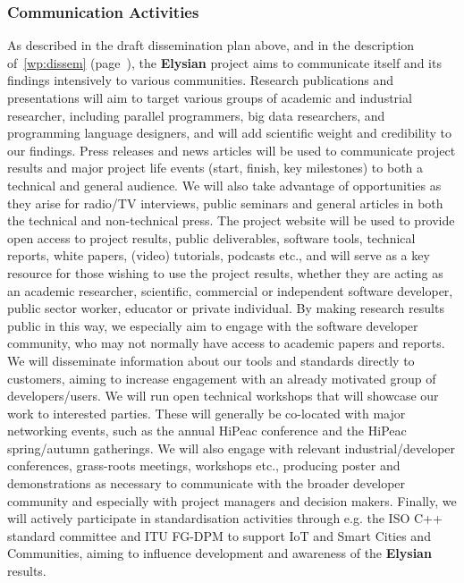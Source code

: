 \documentclass[a4paper,11pt]{article}
\newcommand{\project}[1]{\textbf{#1}\xspace}
\newcommand{\SECURITY}{\project{Elysian}}
\newcommand{\TheProject}{\SECURITY}
\begin{document}
\draftpage
\subsubsection{Communication Activities}
\label{sect:comm-activities}


As described in the draft dissemination plan above, and in the description of~\ref{wp:dissem} (page~\pageref{wp:dissem}),
the \TheProject{} project aims to communicate itself and its findings intensively to various communities.
Research publications and presentations will aim to target various groups of academic and industrial researcher,
including parallel programmers, big data researchers, and programming language
designers, and will add scientific weight and credibility to our findings.  Press releases and news articles will be used to communicate project results and major
project life events (start, finish, key milestones) to both a technical and general audience.
We will also take advantage of opportunities as they arise for radio/TV interviews, public seminars and general articles
in both the technical and non-technical press.
The project website will be used to provide open access to project results, public deliverables,
software tools, technical reports, white papers, (video) tutorials, podcasts etc., and will serve
as a key resource for those wishing to use the project results, whether they are acting as an academic researcher, scientific, commercial or independent
software developer, public sector worker,  educator or private individual.
By making research results public in this way, we especially aim to engage with the software developer
community, who may not normally have access to academic papers and reports.
We will disseminate information about our tools and standards directly to customers, aiming to
increase engagement with an already motivated group of developers/users.
We will run open technical workshops that will showcase our work to interested parties.
These will generally be co-located with major networking events, such as the annual HiPeac
conference and the HiPeac spring/autumn gatherings.
We will also engage with relevant industrial/developer conferences, grass-roots meetings, workshops etc.,
producing poster and demonstrations as necessary to communicate with the broader developer community
and especially with project managers and decision makers.
Finally, we will actively participate in standardisation activities through e.g. the ISO C++ standard committee and ITU FG-DPM to support IoT and Smart Cities and Communities,
aiming to influence development and awareness of the \TheProject{} results.
\end{document}
